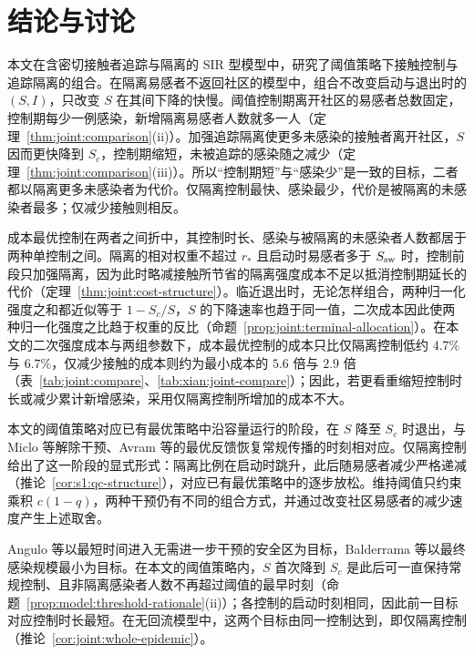 \section{结论与讨论}
\label{sec:discussion}
\label{sec:conclusion}
本文在含密切接触者追踪与隔离的 SIR 型模型中，研究了阈值策略下接触控制与追踪隔离的组合。在隔离易感者不返回社区的模型中，组合不改变启动与退出时的 $(S,I)$，只改变 $S$ 在其间下降的快慢。阈值控制期离开社区的易感者总数固定，控制期每少一例感染，新增隔离易感者人数就多一人（定理~\ref{thm:joint:comparison}(ii)）。加强追踪隔离使更多未感染的接触者离开社区，$S$ 因而更快降到 $S_c$，控制期缩短，未被追踪的感染随之减少（定理~\ref{thm:joint:comparison}(iii)）。所以“控制期短”与“感染少”是一致的目标，二者都以隔离更多未感染者为代价。仅隔离控制最快、感染最少，代价是被隔离的未感染者最多；仅减少接触则相反。

成本最优控制在两者之间折中，其控制时长、感染与被隔离的未感染者人数都居于两种单控制之间。隔离的相对权重不超过 $r_*$ 且启动时易感者多于 $S_{\rm sw}$ 时，控制前段只加强隔离，因为此时略减接触所节省的隔离强度成本不足以抵消控制期延长的代价（定理~\ref{thm:joint:cost-structure}）。临近退出时，无论怎样组合，两种归一化强度之和都近似等于 $1-S_c/S$，$S$ 的下降速率也趋于同一值，二次成本因此使两种归一化强度之比趋于权重的反比（命题~\ref{prop:joint:terminal-allocation}）。在本文的二次强度成本与两组参数下，成本最优控制的成本只比仅隔离控制低约 $4.7\%$ 与 $6.7\%$，仅减少接触的成本则约为最小成本的 $5.6$ 倍与 $2.9$ 倍（表~\ref{tab:joint:compare}、\ref{tab:xian:joint-compare}）；因此，若更看重缩短控制时长或减少累计新增感染，采用仅隔离控制所增加的成本不大。

本文的阈值策略对应已有最优策略中沿容量运行的阶段，在 $S$ 降至 $S_c$ 时退出，与 Miclo 等\cite{Miclo2022ICU}解除干预、Avram 等\cite{Avram2022}的最优反馈恢复常规传播的时刻相对应。仅隔离控制给出了这一阶段的显式形式：隔离比例在启动时跳升，此后随易感者减少严格递减（推论~\ref{cor:s1:qc-structure}），对应已有最优策略中的逐步放松。维持阈值只约束乘积 $c(1-q)$，两种干预仍有不同的组合方式，并通过改变社区易感者的减少速度产生上述取舍。

Angulo 等\cite{Angulo2021}以最短时间进入无需进一步干预的安全区为目标，Balderrama 等\cite{Balderrama2024}以最终感染规模最小为目标。在本文的阈值策略内，$S$ 首次降到 $S_c$ 是此后可一直保持常规控制、且非隔离感染者人数不再超过阈值的最早时刻（命题~\ref{prop:model:threshold-rationale}(ii)）；各控制的启动时刻相同，因此前一目标对应控制时长最短。在无回流模型中，这两个目标由同一控制达到，即仅隔离控制（推论~\ref{cor:joint:whole-epidemic}）。

